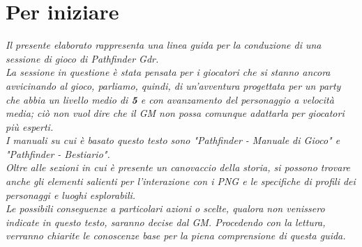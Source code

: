 \chapter{Per iniziare}
				\emph{Il presente elaborato rappresenta una linea guida per la conduzione di una sessione di gioco di \textit{Pathfinder Gdr}.\\
				La sessione in questione è stata pensata per i giocatori che si stanno ancora avvicinando al gioco, parliamo, quindi, di un'avventura progettata per un party che abbia un \emph{livello medio} di \textbf{5} e con avanzamento del personaggio a velocità media; ciò non vuol dire che il GM non possa comunque adattarla per giocatori più esperti.\\
				I manuali su cui è basato questo testo sono \textit{"Pathfinder - Manuale di Gioco"} e \textit{"Pathfinder - Bestiario"}.\\ 
				Oltre alle sezioni in cui è presente un canovaccio della storia, si possono trovare anche gli elementi salienti per l'interazione con i PNG e le specifiche di profili dei personaggi e luoghi esplorabili.\\
				Le possibili conseguenze a particolari azioni o scelte, qualora non venissero indicate in questo testo, saranno decise dal GM. Procedendo con la lettura, verranno chiarite le conoscenze base per la piena comprensione di questa guida.}